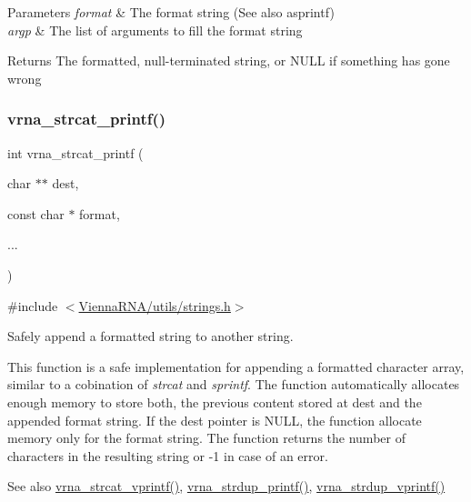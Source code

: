 \begin{DoxyParams}{Parameters}
{\em format} & The format string (See also asprintf) \\
\hline
{\em argp} & The list of arguments to fill the format string \\
\hline
\end{DoxyParams}
\begin{DoxyReturn}{Returns}
The formatted, null-\/terminated string, or N\+U\+LL if something has gone wrong 
\end{DoxyReturn}
\mbox{\label{group__string__utils_gac0771ec71316023067f2aae61a5aa0fb}} 
\subsubsection{\texorpdfstring{vrna\+\_\+strcat\+\_\+printf()}{vrna\_strcat\_printf()}}
{\footnotesize\ttfamily int vrna\+\_\+strcat\+\_\+printf (\begin{DoxyParamCaption}\item[{char $\ast$$\ast$}]{dest,  }\item[{const char $\ast$}]{format,  }\item[{}]{... }\end{DoxyParamCaption})}



{\ttfamily \#include $<$\hyperlink{strings_8h}{Vienna\+R\+N\+A/utils/strings.\+h}$>$}



Safely append a formatted string to another string. 

This function is a safe implementation for appending a formatted character array, similar to a cobination of {\itshape strcat} and {\itshape sprintf}. The function automatically allocates enough memory to store both, the previous content stored at {\ttfamily dest} and the appended format string. If the {\ttfamily dest} pointer is N\+U\+LL, the function allocate memory only for the format string. The function returns the number of characters in the resulting string or -\/1 in case of an error.

\begin{DoxySeeAlso}{See also}
\hyperlink{group__string__utils_ga122df216996ba62fd5056b7743e3131a}{vrna\+\_\+strcat\+\_\+vprintf()}, \hyperlink{group__string__utils_ga33cc0190a326ec368277caa777b8bf18}{vrna\+\_\+strdup\+\_\+printf()}, \hyperlink{group__string__utils_ga459fdee190ed81bb7773cbaf671748a9}{vrna\+\_\+strdup\+\_\+vprintf()}
\end{DoxySeeAlso}

